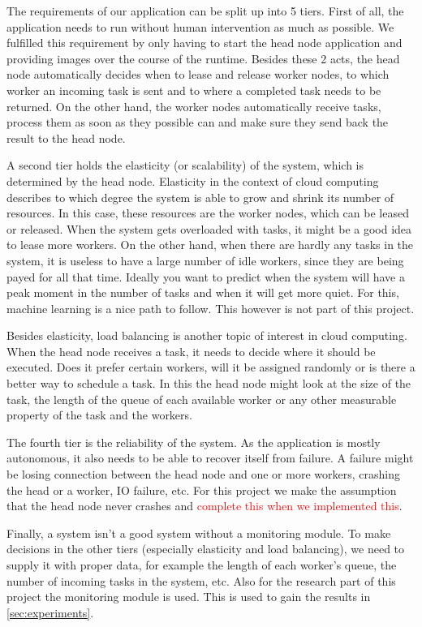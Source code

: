 \documentclass{stylesheet}
\begin{document}
The requirements of our application can be split up into 5 tiers. First of all, the application needs to run without human intervention as much as possible. We fulfilled this requirement by only having to start the head node application and providing images over the course of the runtime. Besides these 2 acts, the head node automatically decides when to lease and release worker nodes, to which worker an incoming task is sent and to where a completed task needs to be returned. On the other hand, the worker nodes automatically receive tasks, process them as soon as they possible can and make sure they send back the result to the head node.

A second tier holds the elasticity (or scalability) of the system, which is determined by the head node. Elasticity in the context of cloud computing describes to which degree the system is able to grow and shrink its number of resources. In this case, these resources are the worker nodes, which can be leased or released. When the system gets overloaded with tasks, it might be a good idea to lease more workers. On the other hand, when there are hardly any tasks in the system, it is useless to have a large number of idle workers, since they are being payed for all that time. Ideally you want to predict when the system will have a peak moment in the number of tasks and when it will get more quiet. For this, machine learning is a nice path to follow. This however is not part of this project.

Besides elasticity, load balancing is another topic of interest in cloud computing. When the head node receives a task, it needs to decide where it should be executed. Does it prefer certain workers, will it be assigned randomly or is there a better way to schedule a task. In this the head node might look at the size of the task, the length of the queue of each available worker or any other measurable property of the task and the workers.

The fourth tier is the reliability of the system. As the application is mostly autonomous, it also needs to be able to recover itself from failure. A failure might be losing connection between the head node and one or more workers, crashing the head or a worker, IO failure, etc. For this project we make the assumption that the head node never crashes and \textcolor{red}{complete this when we implemented this}.

Finally, a system isn't a good system without a monitoring module. To make decisions in the other tiers (especially elasticity and load balancing), we need to supply it with proper data, for example the length of each worker's queue, the number of incoming tasks in the system, etc. Also for the research part of this project the monitoring module is used. This is used to gain the results in \cref{sec:experiments}.
\end{document}
